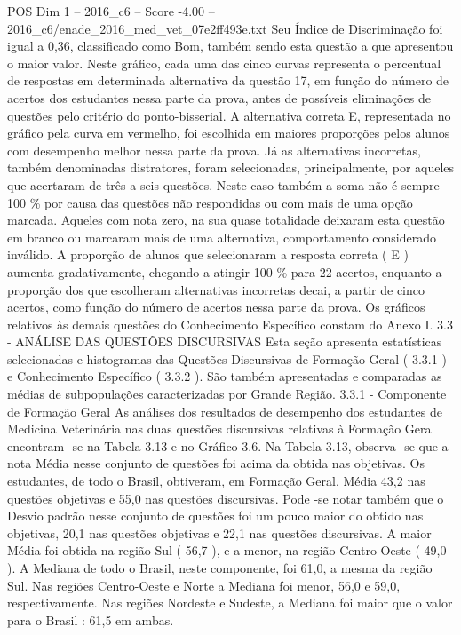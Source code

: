 \begin{textsample}{POS Dim 1 – 2016\_c6 – Score -4.00 – 2016\_c6/enade\_2016\_med\_vet\_07e2ff493e.txt}
Seu Índice de Discriminação foi igual a 0,36, classificado como Bom, também sendo esta questão a que apresentou o maior valor.
Neste gráfico, cada uma das cinco curvas representa o percentual de respostas em determinada alternativa da questão 17, em função do número de acertos dos estudantes nessa parte da prova, antes de possíveis eliminações de questões pelo critério do ponto-bisserial.
A alternativa correta E, representada no gráfico pela curva em vermelho, foi escolhida em maiores proporções pelos alunos com desempenho melhor nessa parte da prova.
Já as alternativas incorretas, também denominadas distratores, foram selecionadas, principalmente, por aqueles que acertaram de três a seis questões.
Neste caso também a soma não é sempre 100 \% por causa das questões não respondidas ou com mais de uma opção marcada.
Aqueles com nota zero, na sua quase totalidade deixaram esta questão em branco ou marcaram mais de uma alternativa, comportamento considerado inválido.
A proporção de alunos que selecionaram a resposta correta ( E ) aumenta gradativamente, chegando a atingir 100 \% para 22 acertos, enquanto a proporção dos que escolheram alternativas incorretas decai, a partir de cinco acertos, como função do número de acertos nessa parte da prova.
Os gráficos relativos às demais questões do Conhecimento Específico constam do Anexo I. 3.3 - ANÁLISE DAS QUESTÕES DISCURSIVAS Esta seção apresenta estatísticas selecionadas e histogramas das Questões Discursivas de Formação Geral ( 3.3.1 ) e Conhecimento Específico ( 3.3.2 ).
São também apresentadas e comparadas as médias de subpopulações caracterizadas por Grande Região. 3.3.1 - Componente de Formação Geral As análises dos resultados de desempenho dos estudantes de Medicina Veterinária nas duas questões discursivas relativas à Formação Geral encontram -se na Tabela 3.13 e no Gráfico 3.6.
Na Tabela 3.13, observa -se que a nota Média nesse conjunto de questões foi acima da obtida nas objetivas.
Os estudantes, de todo o Brasil, obtiveram, em Formação Geral, Média 43,2 nas questões objetivas e 55,0 nas questões discursivas.
Pode -se notar também que o Desvio padrão nesse conjunto de questões foi um pouco maior do obtido nas objetivas, 20,1 nas questões objetivas e 22,1 nas questões discursivas.
A maior Média foi obtida na região Sul ( 56,7 ), e a menor, na região Centro-Oeste ( 49,0 ).
A Mediana de todo o Brasil, neste componente, foi 61,0, a mesma da região Sul.
Nas regiões Centro-Oeste e Norte a Mediana foi menor, 56,0 e 59,0, respectivamente.
Nas regiões Nordeste e Sudeste, a Mediana foi maior que o valor para o Brasil : 61,5 em ambas.

\end{textsample}

